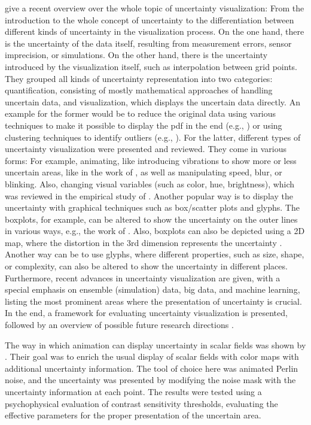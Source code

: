  give a recent overview over the whole topic of uncertainty visualization: From the introduction to the whole concept of uncertainty to the differentiation between different kinds of uncertainty in the visualization process.
On the one hand, there is the uncertainty of the data itself, resulting from measurement errors, sensor imprecision, or simulations. 
On the other hand, there is the uncertainty introduced by the visualization itself, such as interpolation between grid points.  
They grouped all kinds of uncertainty representation into two categories: quantification, consisting of mostly mathematical approaches of handling uncertain data, and visualization, which displays the uncertain data directly. 
An example for the former would be to reduce the original data using various techniques to make it possible to display the \ac{pdf} in the end (e.g., ) or using clustering techniques to identify outliers (e.g., \cite{bordoloi_visualization_2004}). 
For the latter, different types of uncertainty visualization were presented and reviewed.
They come in various forms: For example, animating, like introducing vibrations to show more or less uncertain areas, like in the work of ,  as well as manipulating speed, blur, or blinking.  
Also, changing visual variables (such as color, hue, brightness), which was reviewed in the empirical study of . 
Another popular way is to display the uncertainty with graphical techniques such as box/scatter plots and glyphs.
The boxplots, for example, can be altered to show the uncertainty on the outer lines in various ways, e.g., the work of \cite{benjamini_opening_1988}. 
Also, boxplots can also be depicted using a 2D map, where the distortion in the 3rd dimension represents the uncertainty \cite{kao_visualizing_2002}. 
Another way can be to use glyphs, where different properties, such as size, shape, or complexity, can also be altered to show the uncertainty in different places. 
Furthermore, recent advances in uncertainty visualization are given, with a special emphasis on ensemble (simulation) data, big data, and machine learning, listing the most prominent areas where the presentation of uncertainty is crucial. 
In the end, a framework for evaluating uncertainty visualization is presented, followed by an overview of possible future research directions \cite{kamal_recent_2021}. 

The way in which animation can display uncertainty in scalar fields was shown by . 
Their goal was to enrich the usual display of scalar fields with color maps with additional uncertainty information. 
The tool of choice here was animated Perlin noise, and the uncertainty was presented by modifying the noise mask with the uncertainty information at each point. 
The results were tested using a psychophysical evaluation of contrast sensitivity thresholds, evaluating the effective parameters for the proper presentation of the uncertain area. \cite{coninx_visualization_2011}

